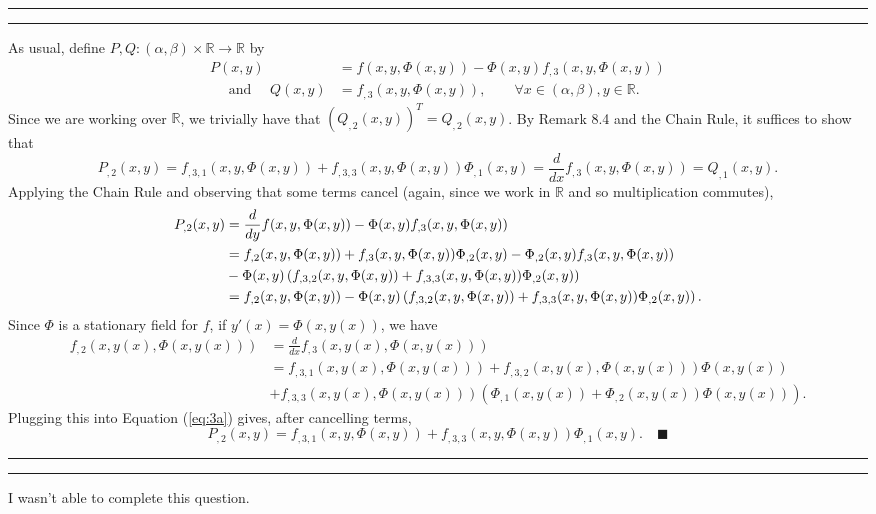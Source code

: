 \documentclass[11pt]{article}
\newcounter{questionCounter}
\newcounter{partCounter}[questionCounter]
\newenvironment{question}[2][\arabic{questionCounter}]{%
    \setcounter{partCounter}{0}%
    \vspace{.25in} \hrule \vspace{0.5em}%
        \noindent{\bf #2}%
    \vspace{0.8em} \hrule \vspace{.10in}%
    \addtocounter{questionCounter}{1}%
}{}
\renewcommand{\qed}{\quad \ensuremath{\blacksquare}}
\newcommand{\R}{\mathbb{R}}             %
\begin{document}
\newpage
\begin{question}{Problem 3}
As usual, define $P, Q : (\alpha,\beta) \times \R \to \R$ by
\begin{align*}
P(x,y) & = f(x,y,\Phi(x,y)) - \Phi(x,y)f_{,3}(x,y,\Phi(x,y))  \\
    \quad \mbox{ and } \quad
    Q(x,y) & = f_{,3}(x,y,\Phi(x,y)),
    \quad\quad \forall x \in (\alpha,\beta), y \in \R.
\end{align*}
Since we are working over $\R$, we trivially have that
$(Q_{,2}(x,y))^T = Q_{,2}(x,y)$.
By Remark 8.4 and the Chain Rule, it suffices to show that
\[P_{,2}(x,y)
    = f_{,3,1}(x,y,\Phi(x,y)) + f_{,3,3}(x,y,\Phi(x,y))\Phi_{,1}(x,y)
    = \frac{d}{dx} f_{,3}(x,y,\Phi(x,y))
    = Q_{,1}(x,y).
\]
Applying the Chain Rule and observing that some terms cancel (again, since we
work in $\R$ and so multiplication commutes),
\begin{align}
\notag
P_{,2}(x,y)
 &  = \frac{d}{dy} f(x,y,\Phi(x,y)) - \Phi(x,y)f_{,3}(x,y,\Phi(x,y))    \\
\notag
 &  = f_{,2}(x,y,\Phi(x,y)) + f_{,3}(x,y,\Phi(x,y))\Phi_{,2}(x,y)
    - \Phi_{,2}(x,y)f_{,3}(x,y,\Phi(x,y))   \\
\notag
 &  - \Phi(x,y) \left( f_{,3,2}(x,y,\Phi(x,y))
    + f_{,3,3}(x,y,\Phi(x,y))\Phi_{,2}(x,y) \right) \\
\label{eq:3a}
 &  = f_{,2}(x,y,\Phi(x,y)) - \Phi(x,y) \left( f_{,3,2}(x,y,\Phi(x,y))
    + f_{,3,3}(x,y,\Phi(x,y))\Phi_{,2}(x,y) \right).
\end{align}
Since $\Phi$ is a stationary field for $f$, if $y'(x) = \Phi(x,y(x))$, we have
\begin{align*}
f_{,2}(x,y(x),\Phi(x,y(x)))
 &  = \frac{d}{dx} f_{,3}(x,y(x),\Phi(x,y(x)))  \\
 &  = f_{,3,1}(x,y(x),\Phi(x,y(x)))
    + f_{,3,2}(x,y(x),\Phi(x,y(x)))\Phi(x,y(x)) \\
 &  + f_{,3,3}(x,y(x),\Phi(x,y(x)))
            \left( \Phi_{,1}(x,y(x)) + \Phi_{,2}(x,y(x))\Phi(x,y(x)) \right).
\end{align*}
Plugging this into Equation (\ref{eq:3a}) gives, after cancelling terms,
\[P_{,2}(x,y)
    = f_{,3,1}(x,y,\Phi(x,y)) + f_{,3,3}(x,y,\Phi(x,y))\Phi_{,1}(x,y). \qed
\]
\end{question}

\begin{question}{Problem 4}

I wasn't able to complete this question.
\end{question}
\end{document}
